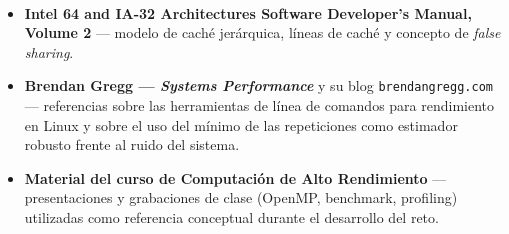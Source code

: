 \begin{itemize}
    \item \textbf{Intel\textsuperscript{\textregistered} 64 and IA-32 Architectures Software Developer's Manual, Volume 2} --- modelo de caché jerárquica, líneas de caché y concepto de \emph{false sharing}.

    \item \textbf{Brendan Gregg --- \textit{Systems Performance}} y su blog \texttt{brendangregg.com} --- referencias sobre las herramientas de línea de comandos para rendimiento en Linux y sobre el uso del mínimo de las repeticiones como estimador robusto frente al ruido del sistema.

    \item \textbf{Material del curso de Computación de Alto Rendimiento} --- presentaciones y grabaciones de clase (OpenMP, benchmark, profiling) utilizadas como referencia conceptual durante el desarrollo del reto.
\end{itemize}
